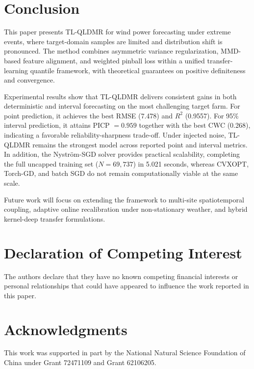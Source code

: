 \documentclass[a4paper]{cas-sc}
\begin{document}
\section{Conclusion}\label{conclusion}
This paper presents TL-QLDMR for wind power forecasting under extreme events, where target-domain samples are limited and distribution shift is pronounced. The method combines asymmetric variance regularization, MMD-based feature alignment, and weighted pinball loss within a unified transfer-learning quantile framework, with theoretical guarantees on positive definiteness and convergence.

Experimental results show that TL-QLDMR delivers consistent gains in both deterministic and interval forecasting on the most challenging target farm. For point prediction, it achieves the best RMSE (7.478) and $R^2$ (0.9557). For 95\% interval prediction, it attains PICP $=0.959$ together with the best CWC (0.268), indicating a favorable reliability-sharpness trade-off. Under injected noise, TL-QLDMR remains the strongest model across reported point and interval metrics. In addition, the Nystr\"{o}m-SGD solver provides practical scalability, completing the full uncapped training set ($N=69{,}737$) in 5.021 seconds, whereas CVXOPT, Torch-GD, and batch SGD do not remain computationally viable at the same scale.

Future work will focus on extending the framework to multi-site spatiotemporal coupling, adaptive online recalibration under non-stationary weather, and hybrid kernel-deep transfer formulations.

\printcredits


\section*{Declaration of Competing Interest}
The authors declare that they have no known competing financial interests or personal relationships that could have appeared to influence the work reported in this paper.


\section*{Acknowledgments}
This work was supported in part by the National Natural Science Foundation of China under Grant 72471109 and Grant 62106205.






\end{document}
